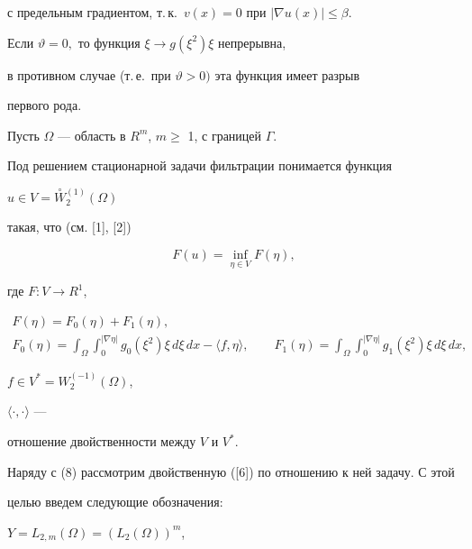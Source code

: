 с предельным градиентом, т.\,к.~$v(x) = 0$ при $| \nabla u(x)| \le \beta$.


Если $\vartheta = 0,$ то функция $\xi \to g(\xi^{2})\xi $ непрерывна, 


в противном случае (т.\,е.~при $\vartheta > 0)$ эта функция имеет разрыв 


первого рода.


 


Пусть $\Omega$ --- область в $R^{m}$, $m \ge $ 1, с границей $\Gamma $. 


Под решением стационарной задачи фильтрации понимается функция 


$u \in V = \overset{\circ}{W}{}^{(1)}_{2}(\Omega)$ 


такая, что (см. [1], [2])


\begin{equation}


F(u) = \inf_{\eta \in V} F(\eta ),


\end{equation}


где $F: V \to R^{1}$,


\begin{gather*}


F(\eta ) = F_{0}(\eta ) + F_{1}(\eta ) ,\\


F_{0}(\eta ) = \int_{\Omega } 


\int^{| \nabla \eta | }_{0}


g_{0}(\xi^{2})\xi\, d \xi\, dx - \langle f, \eta \rangle,


\qquad


F_{1}(\eta ) = \int_{\Omega } 


\int^{| \nabla \eta | }_{0}


g_{1}(\xi^{2})\xi\, d \xi\, dx,


\end{gather*}


$f \in V^{*} = W^{(-1)}_{2}(\Omega )$, 


$\langle \cdot, \cdot \rangle $ ---


отношение двойственности между $V$ и $V^{*}$.


 


Наряду с (8) рассмотрим двойственную ([6]) по отношению к ней задачу. С этой 


целью введем следующие обозначения:


$Y = L_{2,m}(\Omega ) = (L_{2}(\Omega ))^{m}$, 


